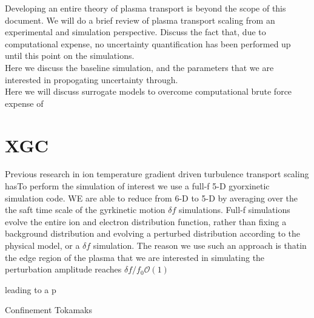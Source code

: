 \documentclass{article}
\begin{document}
Developing an entire theory of plasma transport is beyond the scope of this document. We will do a brief review of plasma transport scaling from an experimental and simulation perspective. Discuss the fact that, due to computational expense, no uncertainty quantification has been performed up until this point on the simulations.\\

Here we discuss the baseline simulation, and the parameters that we are interested in propogating uncertainty through.\\
Here we will discuss surrogate models to overcome computational brute force expense of 

\section{XGC}
Previous research in ion temperature gradient driven turbulence transport scaling hasTo perform the simulation of interest we use a full-f 5-D gyorxinetic simulation code. WE are able to reduce from 6-D to 5-D by averaging over the the saft time scale of the gyrkinetic motion $\delta f$ simulations. 
Full-f simulations evolve the entire ion and electron distribution function, rather than fixing a background distribution and evolving a perturbed distribution according to the physical model, or a $\delta f$ simulation. The reason we use such an approach is thatin the edge region of the plasma that we are interested in simulating the perturbation amplitude reaches $\delta f / f_0  \mathcal{O}(1)$

leading to a p

Confinement
Tokamaks
\end{document}
